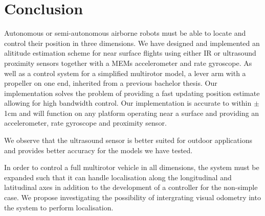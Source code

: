 \section{Conclusion}\label{sec:conclusion}
Autonomous or semi-autonomous airborne robots must be able to locate and control their position in three dimensions. We have designed
and implemented an alititude estimation scheme for near surface flights using either IR or ultrasound proximity sensors together with 
a MEMs accelerometer and rate gyroscope. As well as a control system for a simplified multirotor model, a lever arm with a propeller 
on one end, inherited from a previous bachelor thesis. Our implementation solves the problem of providing a fast updating position
estimate allowing for high bandwidth control. Our implementation is accurate to within \(\pm\)1cm and will function on any platform
operating near a surface and providing an accelerometer, rate gyroscope and proximity sensor.

We observe that the ultrasound 
sensor is better suited for outdoor applications and provides better accuracy for the models we have tested.

In order to control a full multirotor vehicle in all dimensions, the system must be expanded such that it can handle localisation 
along the longitudinal and latitudinal axes in addition to the development of a controller for the non-simple case. 
We propose investigating the possibility of intergrating visual odometry into the system to perform localisation.
